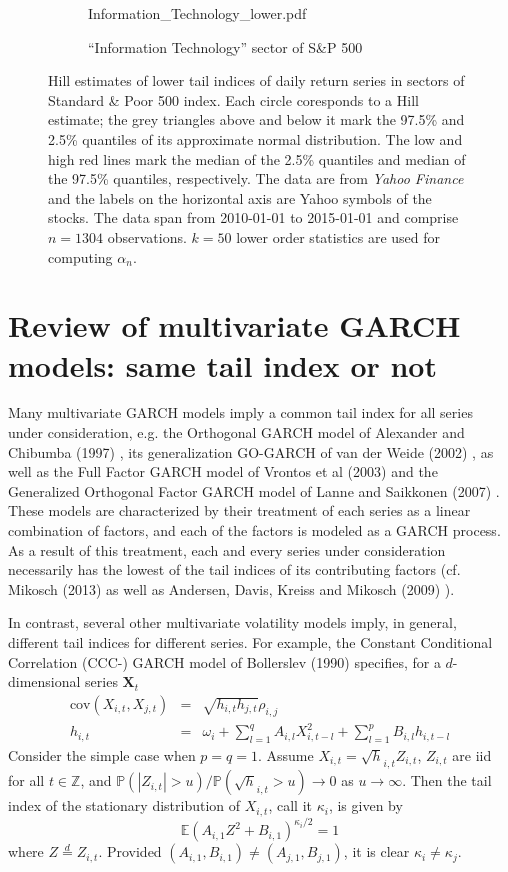 \documentclass{article}
\newcommand{\E}{
  \mathbb{E}
}
\renewcommand{\P}{
  \mathbb{P}
}
\newcommand{\1}[1]{
  \mathbf{1}_{\{#1\}}
}
\renewcommand\vec[1]{
  \mathbf{#1}
}
\newcommand\cov{
  \text{cov}
}
\begin{document}
\begin{figure}[htb!]
\begin{subfigure}[b]{\linewidth}
                    {Information_Technology_lower.pdf}
    \caption{``Information Technology'' sector of S\&P 500}
    \label{fig:Information_Technology_lower}
  \end{subfigure}
  \caption{\small Hill estimates of lower tail indices of
    daily return series in sectors of Standard \& Poor
    500 index. Each circle coresponds to a Hill estimate; the grey
    triangles above and below it mark the 97.5\% and 2.5\% quantiles
    of its approximate normal distribution.
    The low and high red lines mark the median of the 2.5\% quantiles
    and median of the 97.5\% quantiles, respectively.
    The data are from {\it Yahoo Finance} and the labels on
    the horizontal axis are Yahoo symbols of the stocks. The data span
    from 2010-01-01 to 2015-01-01 and comprise $n=1304$
    observations. $k=50$ lower order statistics are used
    for computing $\alpha_n$. 
  }
\end{figure}

\section{Review of multivariate GARCH models:
  same tail index or not}
Many multivariate GARCH models imply a common tail index for all
series under consideration, e.g. the Orthogonal GARCH model of
Alexander and Chibumba (1997) \cite{alexander1997multivariate}, its
generalization GO-GARCH of van der Weide (2002) \cite{van2002go}, as
well as the Full Factor GARCH model of Vrontos et al (2003)
\cite{vrontos2003full} and the Generalized Orthogonal Factor GARCH
model of Lanne and Saikkonen (2007) \cite{lanne2007modeling}. These
models are characterized by their treatment of each series as a linear
combination of factors, and each of the factors is modeled as a GARCH
process. As a result of this treatment, each and every series under
consideration necessarily has the lowest of the tail indices of its
contributing factors (cf. Mikosch (2013) \cite{Mikosch2013} as well
as Andersen, Davis, Kreiss and Mikosch (2009)
\cite{andersen2009handbook}).

In contrast, several other multivariate volatility models imply, in
general, different tail indices for different series. For example, the
Constant Conditional Correlation (CCC-) GARCH model of Bollerslev
(1990) \cite{bollerslev1990modelling} specifies, for a $d$-dimensional
series $\vec X_t$
\begin{eqnarray}
  \cov(X_{i,t}, X_{j,t}) &=& \sqrt{h_{i,t} h_{j,t}} \rho_{i,j}
  \nonumber \\
  h_{i,t} &=& \omega_i + \sum_{l=1}^q A_{i,l} X_{i, t-l}^2 +
  \sum_{l=1}^p B_{i,l} h_{i, t-l} \label{eq:CCC-GARCH}
\end{eqnarray}
Consider the simple case when $p=q=1$. Assume
$X_{i, t} = \sqrt h_{i,t} Z_{i,t}$, $Z_{i, t}$ are iid for
all $t \in \mathbb Z$, and $\P(|Z_{i,t}| > u)/\P(\sqrt h_{i,t} > u) \to 0$ as
$u \to \infty$. Then the tail index of the stationary distribution of
$X_{i,t}$, call it $\kappa_i$, is given by
\[
\E (A_{i, 1} Z^2 + B_{i, 1})^{\kappa_i / 2} = 1
\]
where $Z \overset{d}{=} Z_{i,t}$.
Provided $(A_{i,1}, B_{i,1}) \neq (A_{j,1}, B_{j,1})$, it is clear
$\kappa_i \neq \kappa_j$.
\end{document}
